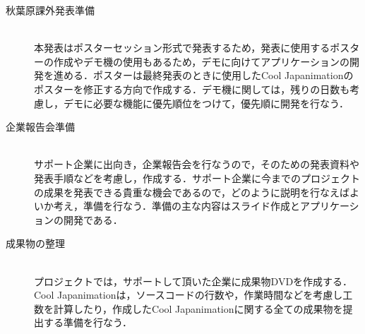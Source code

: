 \begin{description}
\item[秋葉原課外発表準備]\mbox{}\\
本発表はポスターセッション形式で発表するため，発表に使用するポスターの作成やデモ機の使用もあるため，デモに向けてアプリケーションの開発を進める．ポスターは最終発表のときに使用したCool Japanimationのポスターを修正する方向で作成する．デモ機に関しては，残りの日数も考慮し，デモに必要な機能に優先順位をつけて，優先順に開発を行なう．
\item[企業報告会準備]\mbox{}\\
サポート企業に出向き，企業報告会を行なうので，そのための発表資料や発表手順などを考慮し，作成する．サポート企業に今までのプロジェクトの成果を発表できる貴重な機会であるので，どのように説明を行なえばよいか考え，準備を行なう．準備の主な内容はスライド作成とアプリケーションの開発である．
\item[成果物の整理]\mbox{}\\
プロジェクトでは，サポートして頂いた企業に成果物DVDを作成する．Cool Japanimationは，ソースコードの行数や，作業時間などを考慮し工数を計算したり，作成したCool Japanimationに関する全ての成果物を提出する準備を行なう．
\end{description}
